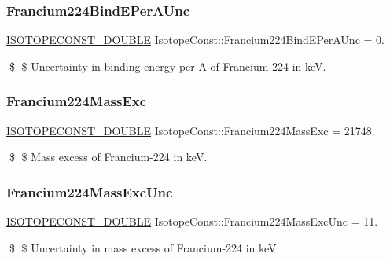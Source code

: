 \subsubsection{\texorpdfstring{Francium224\+Bind\+E\+Per\+A\+Unc}{Francium224BindEPerAUnc}}
{\footnotesize\ttfamily \mbox{\hyperlink{group___isotope_const-_macros_ga8f45a7272ce02c0b4c65c44636ed719a}{I\+S\+O\+T\+O\+P\+E\+C\+O\+N\+S\+T\+\_\+\+D\+O\+U\+B\+LE}} Isotope\+Const\+::\+Francium224\+Bind\+E\+Per\+A\+Unc = 0.}

\$ \$ Uncertainty in binding energy per A of Francium-\/224 in keV. \mbox{\label{group___isotope_const-_francium-_fr224_ga04c0b4f8450a010cb5611e69234412b8}} 
\subsubsection{\texorpdfstring{Francium224\+Mass\+Exc}{Francium224MassExc}}
{\footnotesize\ttfamily \mbox{\hyperlink{group___isotope_const-_macros_ga8f45a7272ce02c0b4c65c44636ed719a}{I\+S\+O\+T\+O\+P\+E\+C\+O\+N\+S\+T\+\_\+\+D\+O\+U\+B\+LE}} Isotope\+Const\+::\+Francium224\+Mass\+Exc = 21748.}

\$ \$ Mass excess of Francium-\/224 in keV. \mbox{\label{group___isotope_const-_francium-_fr224_ga121190a6e3ab01e48386ba730e815d0a}} 
\subsubsection{\texorpdfstring{Francium224\+Mass\+Exc\+Unc}{Francium224MassExcUnc}}
{\footnotesize\ttfamily \mbox{\hyperlink{group___isotope_const-_macros_ga8f45a7272ce02c0b4c65c44636ed719a}{I\+S\+O\+T\+O\+P\+E\+C\+O\+N\+S\+T\+\_\+\+D\+O\+U\+B\+LE}} Isotope\+Const\+::\+Francium224\+Mass\+Exc\+Unc = 11.}

\$ \$ Uncertainty in mass excess of Francium-\/224 in keV. \mbox{\label{group___isotope_const-_francium-_fr224_ga0bf8485603ec4c95253117864d362733}} 
